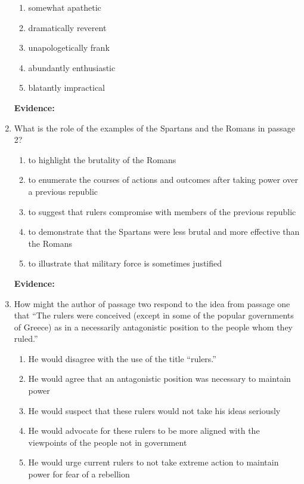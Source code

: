 \begin{enumerate}
\bigskip
\begin{enumerate}[label=(\Alph*)]
\item somewhat apathetic
\item dramatically reverent
\item unapologetically frank
\item abundantly enthusiastic
\item blatantly impractical
\end{enumerate}

\bigskip
\textbf{Evidence:} \hrulefill


\bigskip
\item What is the role of the examples of the Spartans and the Romans in passage 2?

\bigskip
\begin{enumerate}[label=(\Alph*)]
\item to highlight the brutality of the Romans
\item to enumerate the courses of actions and outcomes after taking power over a previous republic
\item to suggest that rulers compromise with  members of the previous republic 
\item to demonstrate that the Spartans were less brutal and more effective than the Romans
\item to illustrate that military force is sometimes justified
\end{enumerate}

\bigskip
\textbf{Evidence:} \hrulefill

\bigskip
\item How might the author of passage two respond to the idea from passage one that ``The rulers were conceived (except in some of the popular governments of Greece) as in a necessarily antagonistic position to the people whom they ruled.''

\bigskip
\begin{enumerate}[label=(\Alph*)]
\item He would disagree with the use of the title ``rulers.''
\item He would agree that an antagonistic position was necessary to maintain power
\item He would suspect that these rulers would not take his ideas seriously
\item He would advocate for these rulers to be more aligned with the viewpoints of the people not in government
\item He would urge current rulers to not take extreme action to maintain power for fear of a rebellion
\end{enumerate}


\end{enumerate}
